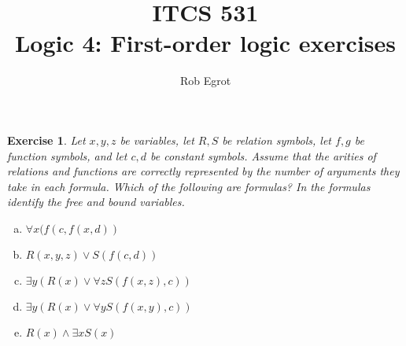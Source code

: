 \documentclass{article}
\title{ITCS 531 \\Logic 4: First-order logic exercises}
\author{Rob Egrot}
\date{}
\theoremstyle{plain}
\newtheorem{Q}[theorem]{Exercise}{\bfseries}{\upshape}
\begin{document}
\maketitle
\begin{Q}
Let $x,y,z$ be variables, let $R,S$ be relation symbols, let $f,g$ be function symbols, and let $c,d$ be constant symbols. Assume that the arities of relations and functions are correctly represented by the number of arguments they take in each formula. Which of the following are formulas? In the formulas identify the free and bound variables.  
\begin{enumerate}[a)]
\item $\forall x (f(c,f(x,d))$
\item $R(x,y,z)\vee S(f(c,d))$
\item $\exists y (R(x) \vee \forall z S(f(x,z),c))$
\item $\exists y (R(x) \vee \forall y S(f(x,y),c))$
\item $R(x) \wedge \exists x S(x)$
\end{enumerate}
\end{Q}
\begin{comment}
\textbf{Solution:}
\begin{enumerate}[a)]
\item This is not a formula.
\item This is a formula, and all its variables are free.
\item This is a formula. Here, $x$ occurs free, and $z$ occurs bound.
\item This is a formula. Here the first $\exists y$ doesn't do anything, as $y$ does not occur free in $R(x) \vee \forall y S(f(x,y),c)$ (it's a \emph{null quantifier}). Here $y$ occurs bound, and $x$ occurs free.
\item This is a formula, and $x$ occurs both free and bound.
\end{enumerate}
\end{comment}
\end{document}
